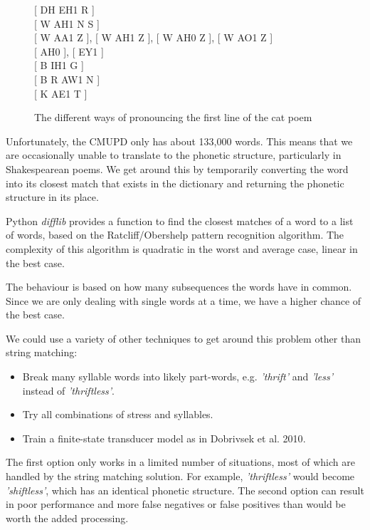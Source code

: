 \begin{figure}
\centering
{[ DH EH1 R ]}\\
{[ W AH1 N S ]}\\
{[ W AA1 Z ], [ W AH1 Z ], [ W AH0 Z ], [ W AO1 Z ]}\\
{[ AH0 ], [ EY1 ]}\\
{[ B IH1 G ]}\\
{[ B R AW1 N ]}\\
{[ K AE1 T ]}
\caption{The different ways of pronouncing the first line of the cat poem}
\label{fig:catpronun}
\end{figure}

Unfortunately, the CMUPD only has about 133,000 words. This means that we are occasionally unable to translate to the phonetic structure, particularly in Shakespearean poems. We get around this by temporarily converting the word into its closest match that exists in the dictionary and returning the phonetic structure in its place.

Python \textit{difflib}\cite{difflib} provides a function to find the closest matches of a word to a list of words, based on the Ratcliff/Obershelp pattern recognition algorithm. The complexity of this algorithm is quadratic in the worst and average case, linear in the best case. 

The behaviour is based on  how many subsequences the words have in common. Since we are only dealing with single words at a time, we have a higher chance of the best case.

We could use a variety of other techniques to get around this problem other than string matching:
\begin{itemize}
\item{Break many syllable words into likely part-words, e.g. \textit{'thrift'} and \textit{'less'} instead of \textit{'thriftless'}.}
\item{Try all combinations of stress and syllables.}
\item{Train a finite-state transducer model as in Dobrivsek et al. 2010\cite{dobrivsek2010towards}.}
\end{itemize}

The first option only works in a limited number of situations, most of which are handled by the string matching solution. For example, \textit{'thriftless'} would become \textit{'shiftless'}, which has an identical phonetic structure. The second option can result in poor performance and more false negatives or false positives than would be worth the added processing.

